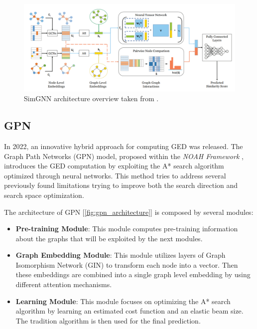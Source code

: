 \documentclass[../Thesis.tex]{subfiles}
\begin{document}
	\begin{figure}[H]
		\centering
		\includegraphics[width=\textwidth]{Images/simgnn_architecture.png}
		\caption{SimGNN architecture overview taken from \cite{simgnn__a_neural_network_approach_to_fast_graph_similarity_computation}.}
		\label{fig:simgnn_architecture}
	\end{figure}

	
	\subsection{GPN}
	\label{sec:gpn}
	
	In 2022, an innovative hybrid approach for computing GED was released.
	The Graph Path Networks (GPN) model, proposed within the \textit{NOAH Framework} \cite{noah__neural_optimized_a*_search_algorithm_for_graph_edit_distance_computation}, introduces the GED computation by exploiting the A* search algorithm optimized through neural networks. This method tries to address several previously found limitations trying to improve both the search direction and search space optimization.
	
	The architecture of GPN [\autoref{fig:gpn_architecture}] is composed by several modules:
	
	\begin{itemize}
		\item \textbf{Pre-training Module}: This module computes pre-training information about the graphs that will be exploited by the next modules.
		\item \textbf{Graph Embedding Module}: This module utilizes layers of Graph Isomorphism Network (GIN) to transform each node into a vector. Then these embeddings are combined into a single graph level embedding by using different attention mechanisms.
		\item \textbf{Learning Module}: This module focuses on optimizing the A* search algorithm by learning an estimated cost function and an elastic beam size. The tradition algorithm is then used for the final prediction.
	\end{itemize}
	
\end{document}
